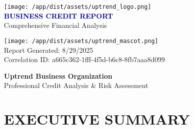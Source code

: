 \documentclass[11pt,a4paper]{article}
\begin{document}
\begin{titlepage}
    \centering
    \vspace*{2cm}
    
    \texttt{[image: /app/dist/assets/uptrend\_logo.png]}\\[1cm]
    
    {\huge\textbf{\textcolor{darkblue}{BUSINESS CREDIT REPORT}}}\\[0.5cm]
    
    {\Large\textcolor{uptrendblue}{Comprehensive Financial Analysis}}\\[2cm]
    
    
    \vspace{2cm}
    
    \texttt{[image: /app/dist/assets/uptrend\_mascot.png]}\\[1cm]
    
    {\large\textcolor{uptrendgray}{Report Generated: 8/29/2025}}\\[0.3cm]
    {\large\textcolor{uptrendgray}{Correlation ID: a665c362-1fff-4f5d-b6c8-8fb7aaa8d099}}
    
    \vfill
    
    {\textcolor{uptrendblue}{\textbf{Uptrend Business Organization}}}\\
    {\small Professional Credit Analysis \& Risk Assessment}
    
\end{titlepage}

\newpage

\section*{EXECUTIVE SUMMARY}
\end{document}
